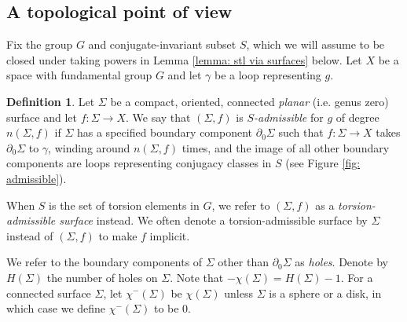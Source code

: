 \documentclass{amsart}
\theoremstyle{definition}
\newtheorem{definition}[theorem]{Definition}
\numberwithin{equation}{section}
\theoremstyle{theorem}
\theoremstyle{remark}
\def\Z{\mathbb Z}
\def\scl{\mathrm{scl}}
\def\stl{\mathrm{stl}}
\begin{document}
	
	\subsection{A topological point of view}\label{subsec: topological}
	Fix the group $G$ and conjugate-invariant subset $S$, which we will assume to be closed under taking powers in Lemma \ref{lemma: stl via surfaces} below.
	Let $X$ be a space with fundamental group $G$ and let $\gamma$ be a loop representing $g$.
	\begin{definition}
		Let $\Sigma$ be a compact, oriented, connected \emph{planar} (i.e. genus zero) surface and let $f:\Sigma\to X$. We say that $(\Sigma,f)$ is \emph{$S$-admissible}
		for $g$ of degree $n(\Sigma,f)$ if $\Sigma$ has a specified boundary component $\partial_0 \Sigma$ such that
		$f:\Sigma\to X$ takes $\partial_0 \Sigma$ to $\gamma$, winding around $n(\Sigma,f)$ times, and the image of all other boundary components are loops representing  conjugacy classes in $S$ (see Figure \ref{fig: admissible}).
		
		When $S$ is the set of torsion elements in $G$, we refer to $(\Sigma,f)$ as a \emph{torsion-admissible surface} instead. We often denote a torsion-admissible surface by $\Sigma$ instead of $(\Sigma,f)$ to make $f$ implicit.
	\end{definition}
	
	We refer to the boundary components of $\Sigma$ other than $\partial_0 \Sigma$ as \emph{holes}. Denote by $H(\Sigma)$ the number of holes on $\Sigma$. Note that $-\chi(\Sigma)=H(\Sigma)-1$.
	For a connected surface $\Sigma$, let $\chi^-(\Sigma)$ be $\chi(\Sigma)$ unless $\Sigma$ is a sphere or a disk, in which case we define $\chi^-(\Sigma)$ to be $0$.
	
\end{document}
